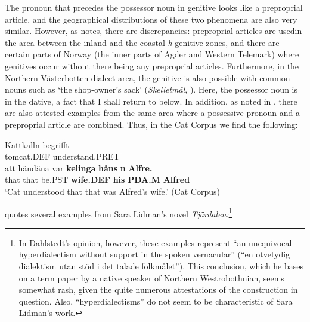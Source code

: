 The pronoun that precedes the possessor noun in genitive looks like a preproprial article, and the geographical distributions of these two phenomena are also very similar. However, as \citet[67]{Delsing2003b} notes, there are discrepancies: preproprial articles are used\textstyleLinguisticExample{ }in the area between the inland and the coastal \textit{h}{}-genitive zones, and there are certain parts of Norway (the inner parts of Agder and Western Telemark) where genitives occur without there being any preproprial articles. Furthermore, in the Northern Västerbotten dialect area, the genitive is also possible with common nouns such as  ‘the shop-owner’s sack’ (\textit{Skelletmål}, \citet[23]{Marklund1976}). Here, the possessor noun is in the dative, a fact that I shall return to below. In addition, as noted in \citet{HolmbergEtAl}, there are also attested examples from the same area where a possessive pronoun and a preproprial article are combined. Thus, in the Cat Corpus we find the following:

\ea\label{}
\gll Kattkalln  begrifft\\
tomcat.DEF  understand.PRET\\
\gll att  händäna  var  \textbf{kelinga} \textbf{håns} \textbf{n} \textbf{Alfre.}\\
that  that  be.PST  \textbf{wife.DEF} \textbf{his} \textbf{PDA.M} \textbf{Alfred}\\
\glt  ‘Cat understood that that was Alfred’s wife.’ (Cat Corpus)
\z

\citet[51]{Dahlstedt1971} quotes several examples from Sara Lidman’s novel \textit{Tjärdalen}\textit{:}\footnote{ In Dahlstedt’s opinion, however, these examples represent “an unequivocal hyperdialectism without support in the spoken vernacular” (“en otvetydig dialektism utan stöd i det talade folkmålet”). This conclusion, which he bases on a term paper by a native speaker of Northern Westrobothnian, seems somewhat rash, given the quite numerous attestations of the construction in question. Also, “hyperdialectisms” do not seem to be characteristic of Sara Lidman’s work.\par }


\ea
{}
\z 
\z

